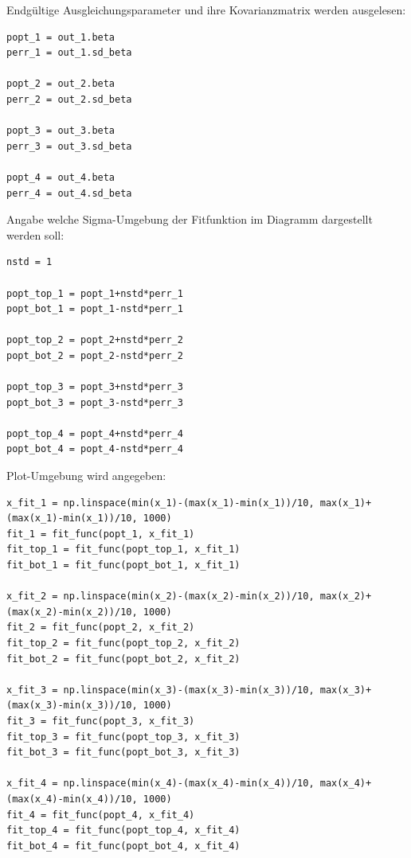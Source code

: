 \documentclass[a4paper,10pt]{article}
\begin{document}
Endgültige Ausgleichungsparameter und ihre Kovarianzmatrix werden ausgelesen:\begin{lstlisting}
popt_1 = out_1.beta
perr_1 = out_1.sd_beta

popt_2 = out_2.beta
perr_2 = out_2.sd_beta

popt_3 = out_3.beta
perr_3 = out_3.sd_beta

popt_4 = out_4.beta
perr_4 = out_4.sd_beta

\end{lstlisting}

Angabe welche Sigma-Umgebung der Fitfunktion im Diagramm dargestellt werden soll:\begin{lstlisting}
nstd = 1

popt_top_1 = popt_1+nstd*perr_1
popt_bot_1 = popt_1-nstd*perr_1

popt_top_2 = popt_2+nstd*perr_2
popt_bot_2 = popt_2-nstd*perr_2

popt_top_3 = popt_3+nstd*perr_3
popt_bot_3 = popt_3-nstd*perr_3

popt_top_4 = popt_4+nstd*perr_4
popt_bot_4 = popt_4-nstd*perr_4

\end{lstlisting}

Plot-Umgebung wird angegeben:\begin{lstlisting}
x_fit_1 = np.linspace(min(x_1)-(max(x_1)-min(x_1))/10, max(x_1)+(max(x_1)-min(x_1))/10, 1000)
fit_1 = fit_func(popt_1, x_fit_1)
fit_top_1 = fit_func(popt_top_1, x_fit_1)
fit_bot_1 = fit_func(popt_bot_1, x_fit_1)

x_fit_2 = np.linspace(min(x_2)-(max(x_2)-min(x_2))/10, max(x_2)+(max(x_2)-min(x_2))/10, 1000)
fit_2 = fit_func(popt_2, x_fit_2)
fit_top_2 = fit_func(popt_top_2, x_fit_2)
fit_bot_2 = fit_func(popt_bot_2, x_fit_2)

x_fit_3 = np.linspace(min(x_3)-(max(x_3)-min(x_3))/10, max(x_3)+(max(x_3)-min(x_3))/10, 1000)
fit_3 = fit_func(popt_3, x_fit_3)
fit_top_3 = fit_func(popt_top_3, x_fit_3)
fit_bot_3 = fit_func(popt_bot_3, x_fit_3)

x_fit_4 = np.linspace(min(x_4)-(max(x_4)-min(x_4))/10, max(x_4)+(max(x_4)-min(x_4))/10, 1000)
fit_4 = fit_func(popt_4, x_fit_4)
fit_top_4 = fit_func(popt_top_4, x_fit_4)
fit_bot_4 = fit_func(popt_bot_4, x_fit_4)

\end{lstlisting}
\end{document}
